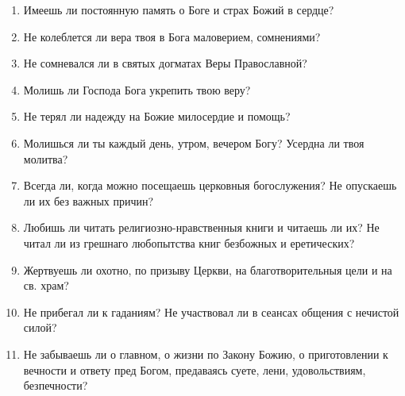 \begin{mymulticols}

\begin{enumerate}

\item Имеешь ли постоянную память о Боге и страх Божий в сердце?

\item Не колеблется ли вера твоя в Бога маловерием, сомнениями?

\item Не сомневался ли в святых догматах Веры Православной?

\item Молишь ли Господа Бога укрепить твою веру?

\item Не терял ли надежду на Божие милосердие и помощь?

\item Молишься ли ты каждый день, утром, вечером Богу? Усердна ли твоя молитва?

\item Всегда ли, когда можно посещаешь церковныя богослужения? Не опускаешь ли их без важных причин?

\item Любишь ли читать религиозно-нравственныя книги и читаешь ли их? Не читал ли из грешнаго любопытства книг безбожных и еретических?

\item Жертвуешь ли охотно, по призыву Церкви, на благотворительныя цели и на св. храм?

\item Не прибегал ли к гаданиям? Не участвовал ли в сеансах общения с нечистой силой?

\item Не забываешь ли о главном, о жизни по Закону Божию, о приготовлении к вечности и ответу пред Богом, предаваясь суете, лени, удовольствиям, безпечности? 

\end{enumerate}

\end{mymulticols}

\nopagebreak

